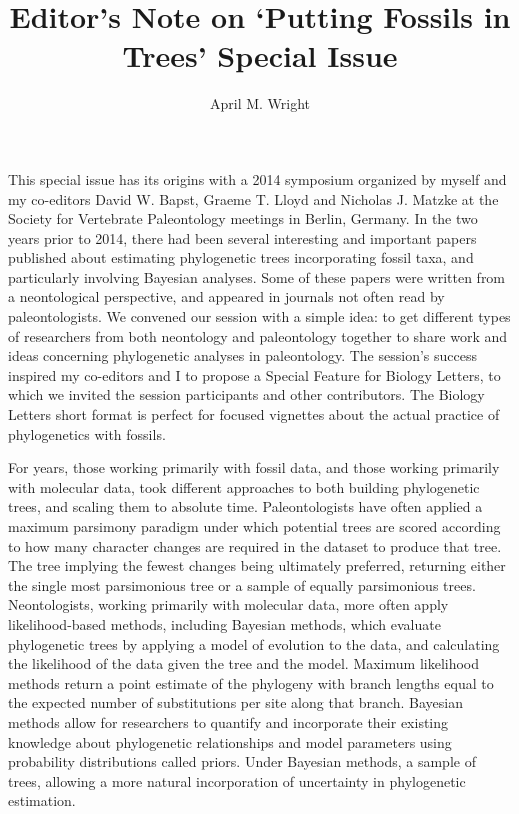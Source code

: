 \documentclass[]{article}
\begin{document}
\title{Editor's Note on `Putting Fossils in Trees' Special Issue}
\author[1,2]{April M. Wright}

\maketitle


This special issue has its origins with a 2014 symposium organized by myself and my co-editors David W. Bapst, Graeme T. Lloyd and Nicholas J. Matzke at the  Society for Vertebrate Paleontology meetings in Berlin, Germany.  In the two years prior to 2014, there had been several interesting and important papers published \cite{stadler2010sampling} 
\cite{ronquist2012total} \cite{bapst2013stochastic}\cite{heath2014fossilized}   about estimating phylogenetic trees incorporating fossil taxa, and particularly involving Bayesian analyses. Some of these papers were written from a neontological perspective, and appeared in journals not often read by paleontologists. We convened our session with a simple idea: to get different types of researchers from both neontology and paleontology together to share work and ideas concerning phylogenetic analyses in paleontology. The session's success inspired my co-editors and I  to propose a Special Feature for Biology Letters, to which we invited the session participants and other contributors. The Biology Letters short format is perfect for focused vignettes about the actual practice of phylogenetics with fossils. \par

For years, those working primarily with fossil data, and those working primarily with molecular data, took different approaches to both building phylogenetic trees, and scaling them to absolute time. Paleontologists have often applied a maximum parsimony paradigm under which potential trees are scored according to how many character changes are required in the dataset to produce that tree. The tree implying the fewest changes being ultimately preferred, returning either the single most parsimonious tree or a sample of equally parsimonious trees. Neontologists, working primarily with molecular data, more often apply likelihood-based methods, including Bayesian methods, which evaluate phylogenetic trees by applying a model of evolution to the data, and calculating the likelihood of the data given the tree and the model. Maximum likelihood methods return a point estimate of the phylogeny with branch lengths equal to the expected number of substitutions per site along that branch. Bayesian methods allow for researchers to quantify and incorporate their existing knowledge about phylogenetic relationships and model parameters using probability distributions called priors. Under Bayesian methods, a sample of trees, allowing a more natural incorporation of uncertainty in phylogenetic estimation. \par
\end{document}
